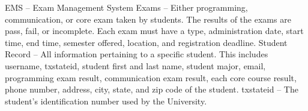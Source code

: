 
   EMS -- Exam Management System
   Exams -- Either programming, communication, or core exam taken by students.
      The results of the exams are pass, fail, or incomplete. Each exam must
      have a type, administration date, start time, end time, semester offered,
      location, and registration deadline.
   Student Record -- All information pertaining to a specific student. This
      includes username, txstateid, student first and last name, student major,
      email, programming exam result, communication exam result, each core
      course result, phone number, address, city, state, and zip code of the
      student.
   txstateid -- The student's identification number used by the University.
